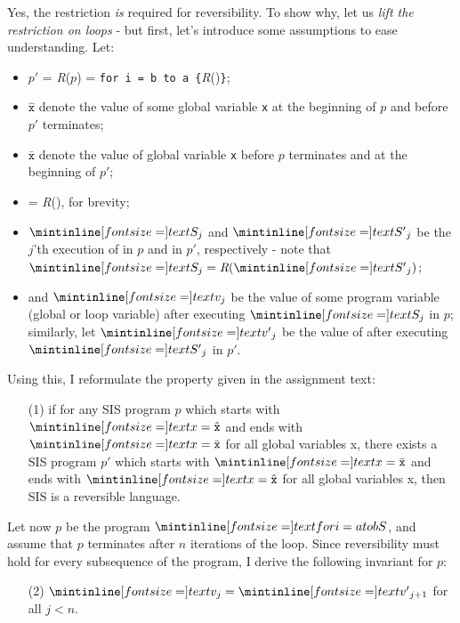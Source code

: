 Yes, the restriction \emph{is} required for reversibility. To show why, let us
\emph{lift the restriction on loops} - but first, let's introduce some
assumptions to ease understanding. Let:


\begin{itemize}
  \item $p'$ = \textit{R}($p$) = \texttt{for i = b to a
    \{}\textit{R}()\texttt{\}};
  \item $\hat{\texttt{x}}$ denote the value of some global variable
    \texttt{x} at the beginning of $p$ and before $p'$ terminates;
  \item $\bar {\texttt{x}}$ denote the value of global variable \texttt{x} before
    $p$ terminates and at the beginning of $p'$;
  \item {} = \textit{R}(), for brevity;
  \item $\ms{S}_j$ and $\ms{S'}_j$ be the $j$'th execution of  in $p$ and
     in $p'$, respectively - note that $\ms{S}_j = \textit{R}(\ms{S'}_j)$;
  \item and $\ms{v}_j$ be the value of some program variable  (global or
    loop variable) after executing $\ms{S}_j$ in $p$; similarly, let $\ms{v'}_j$
    be the value of  after executing $\ms{S'}_{j}$ in $p'$.
\end{itemize}

Using this, I reformulate the property given in the assignment text:

\begin{enumerate}

  \item[(1)] if for any SIS program $p$ which starts with $\ms x =
    \hat{\texttt{x}}$ and ends with $\ms x = \bar{\texttt{x}}$ for all global
    variables \ms x, there exists a SIS program $p'$ which starts with $\ms x =
    \bar{\texttt{x}}$ and ends with $\ms x = \hat{\texttt{x}}$ for all global
    variables \ms x, then SIS is a reversible language.

\end{enumerate}

Let now $p$ be the program $\ms{for i = a to b { S }}$, and assume that $p$
terminates after $n$ iterations of the loop.
Since reversibility must hold for every subsequence of the program, I derive the
following invariant for $p$:

\begin{enumerate}
  \item[(2)] $\ms{v}_j = \ms{v'}_{j + 1}$ for all $j < n$.
\end{enumerate}

